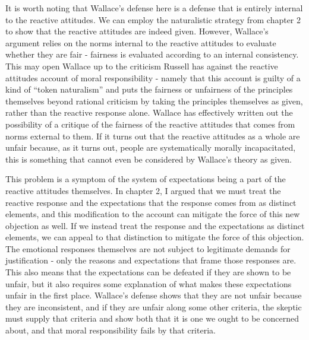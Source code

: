 \documentclass[phd,12pt,oneside,paper=letterpaper]{ubcthesis}
\begin{document}
It is worth noting that Wallace's defense here is a defense that is entirely internal to the reactive attitudes. We can employ the naturalistic strategy from chapter 2 to show that the reactive attitudes are indeed given. However, Wallace's argument relies on the norms internal to the reactive attitudes to evaluate whether they are fair - fairness is evaluated according to an internal consistency. This may open Wallace up to the criticism Russell \citeyearpar[p.297-8]{russell1992} has against the reactive attitudes account of moral responsibility - namely that this account is guilty of a kind of ``token naturalism'' and puts the fairness or unfairness of the principles themselves beyond rational criticism by taking the principles themselves as given, rather than the reactive response alone. Wallace has effectively written out the possibility of a critique of the fairness of the reactive attitudes that comes from norms external to them. If it turns out that the reactive attitudes as a whole are unfair because, as it turns out, people are systematically morally incapacitated, this is something that cannot even be considered by Wallace's theory as given. 

This problem is a symptom of the system of expectations being a part of the reactive attitudes themselves. In chapter 2, I argued that we must treat the reactive response and the expectations that the response comes from as distinct elements, and this modification to the account can mitigate the force of this new objection as well. If we instead treat the response and the expectations as distinct elements, we can appeal to that distinction to mitigate the force of this objection. The emotional responses themselves are not subject to legitimate demands for justification - only the reasons and expectations that frame those responses are. This also means that the expectations can be defeated if they are shown to be unfair, but it also requires some explanation of what makes these expectations unfair in the first place. Wallace's defense shows that they are not unfair because they are inconsistent, and if they are unfair along some other criteria, the skeptic must supply that criteria and show both that it is one we ought to be concerned about, and that moral responsibility fails by that criteria. 
\end{document}
